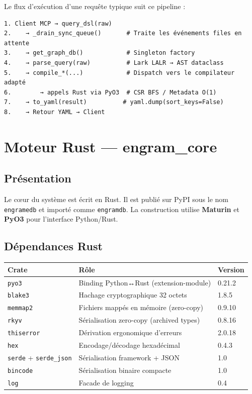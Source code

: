 \documentclass[12pt,a4paper]{article}
\newcommand{\code}[1]{\texttt{#1}}
\newcommand{\rust}{\textcolor{rustorange}{Rust}}
\begin{document}
Le flux d'exécution d'une requête typique suit ce pipeline :

\begin{lstlisting}
1. Client MCP → query_dsl(raw)
2.    → _drain_sync_queue()       # Traite les événements files en attente
3.    → get_graph_db()            # Singleton factory
4.    → parse_query(raw)          # Lark LALR → AST dataclass
5.    → compile_*(...)            # Dispatch vers le compilateur adapté
6.        → appels Rust via PyO3  # CSR BFS / Metadata O(1)
7.    → to_yaml(result)          # yaml.dump(sort_keys=False)
8.    → Retour YAML → Client
\end{lstlisting}

\section{Moteur Rust — engram\_core}

\subsection{Présentation}

Le cœur du système est écrit en \rust{}. Il est publié sur PyPI sous le nom \code{engramedb} et importé comme \code{engramdb}. La construction utilise \textbf{Maturin} et \textbf{PyO3} pour l'interface Python/Rust.

\subsection{Dépendances Rust}

\begin{center}
\begin{tabularx}{\textwidth}{lXl}
\toprule
\textbf{Crate} & \textbf{Rôle} & \textbf{Version} \\
\midrule
\code{pyo3} & Binding Python↔Rust (extension-module) & 0.21.2 \\
\code{blake3} & Hachage cryptographique 32 octets & 1.8.5 \\
\code{memmap2} & Fichiers mappés en mémoire (zero-copy) & 0.9.10 \\
\code{rkyv} & Sérialisation zero-copy (archived types) & 0.8.16 \\
\code{thiserror} & Dérivation ergonomique d'erreurs & 2.0.18 \\
\code{hex} & Encodage/décodage hexadécimal & 0.4.3 \\
\code{serde} + \code{serde\_json} & Sérialisation framework + JSON & 1.0 \\
\code{bincode} & Sérialisation binaire compacte & 1.0 \\
\code{log} & Facade de logging & 0.4 \\
\bottomrule
\end{tabularx}
\end{center}
\end{document}
